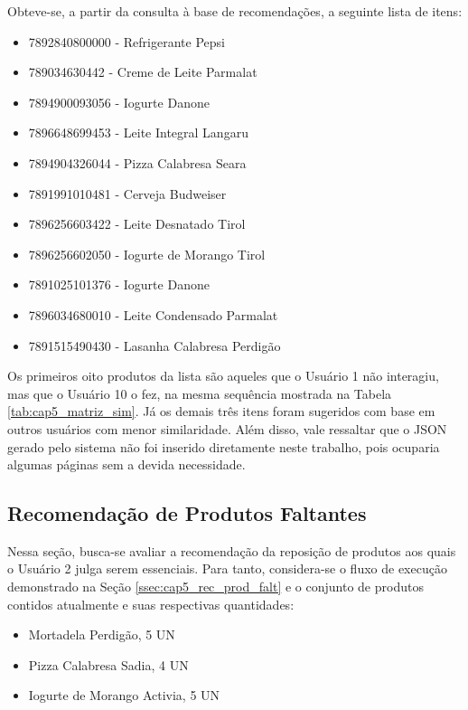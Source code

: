 Obteve-se, a partir da consulta à base de recomendações, a seguinte lista de itens:

\begin{itemize} \parskip -3pt
    \item 7892840800000 - Refrigerante Pepsi
    \item 789034630442 - Creme de Leite Parmalat
    \item 7894900093056 - Iogurte Danone
    \item 7896648699453 - Leite Integral Langaru
    \item 7894904326044 - Pizza Calabresa Seara
    \item 7891991010481 - Cerveja Budweiser
    \item 7896256603422 - Leite Desnatado Tirol
    \item 7896256602050 - Iogurte de Morango Tirol
    \item 7891025101376 - Iogurte Danone
    \item 7896034680010 - Leite Condensado Parmalat
    \item 7891515490430 - Lasanha Calabresa Perdigão
\end{itemize}


Os primeiros oito produtos da lista são aqueles que o Usuário 1 não interagiu, mas que o Usuário 10 o fez, na mesma sequência mostrada na Tabela \ref{tab:cap5_matriz_sim}. Já os demais três itens foram sugeridos com base em outros usuários com menor similaridade.
Além disso, vale ressaltar que o JSON gerado pelo sistema não foi inserido diretamente neste trabalho, pois ocuparia algumas páginas sem a devida necessidade.

\subsection{Recomendação de Produtos Faltantes}

Nessa seção, busca-se avaliar a recomendação da reposição de produtos aos quais o Usuário 2 julga serem essenciais. Para tanto, considera-se o fluxo de execução demonstrado na Seção \ref{ssec:cap5_rec_prod_falt} e o conjunto de produtos contidos atualmente e suas respectivas quantidades:

\begin{itemize} \parskip -3pt
    \item Mortadela Perdigão, 5 UN
    \item Pizza Calabresa Sadia, 4 UN
    \item Iogurte de Morango Activia, 5 UN
\end{itemize}

